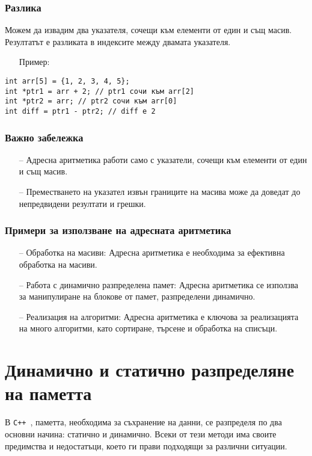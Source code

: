 \documentclass[oneside]{book}
\newcommand*{\cpp}{\texttt{C++}\ }
\begin{document}
\subsubsection{Разлика}
Можем да извадим два указателя, сочещи към елементи от един и същ масив. Резултатът е разликата в индексите между двамата указателя.

\begin{itemize}\item[Пример:]\end{itemize}
\begin{mdframed}\begin{lstlisting}
int arr[5] = {1, 2, 3, 4, 5};
int *ptr1 = arr + 2; // ptr1 сочи към arr[2]
int *ptr2 = arr; // ptr2 сочи към arr[0]
int diff = ptr1 - ptr2; // diff е 2
\end{lstlisting}\end{mdframed}

\subsubsection{Важно забележка}
\begin{itemize}
    \item[--] Адресна аритметика работи само с указатели, сочещи към елементи от един и същ масив.
    \item[--] Преместването на указател извън границите на масива може да доведат до непредвидени резултати и грешки.
\end{itemize}

\subsubsection{Примери за използване на адресната аритметика}
\begin{itemize}
    \item[--] Обработка на масиви: Адресна аритметика е необходима за ефективна обработка на масиви.
    \item[--] Работа с динамично разпределена памет: Адресна аритметика се използва за манипулиране на блокове от памет, разпределени динамично.
    \item[--] Реализация на алгоритми: Адресна аритметика е ключова за реализацията на много алгоритми, като сортиране, търсене и обработка на списъци.
\end{itemize}

\section{Динамично и статично разпределяне на паметта}\label{sec:allocation}
В \cpp, паметта, необходима за съхранение на данни, се разпределя по два основни начина: статично и динамично. Всеки от тези методи има своите предимства и недостатъци, което ги прави подходящи за различни ситуации.
\end{document}

